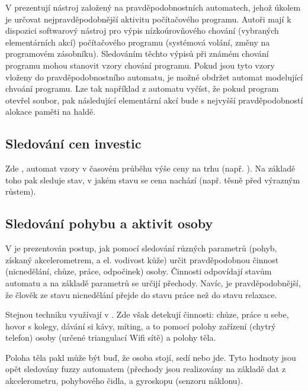\documentclass[a4paper,10pt]{article}
\begin{document}
V \cite{Maz+-ProTreAutAppBehMod} prezentují nástroj založený na pravděpodobnostních automatech, jehož úkolem je určovat nejpravděpodobnější aktivitu počítačového programu. Autoři mají k dispozici softwarový nástroj pro výpis nízkoúrovňového chování (vybraných elementárních akcí) počítačového programu (systémová volání, změny na programovém zásobníku). Sledováním těchto výpisů při známém chování programu mohou stanovit vzory chování programu. Pokud jsou tyto vzory vloženy do pravděpodobnostního automatu, je možné obdržet automat modelující chvoání programu. Lze tak například z automatu vyčíst, že pokud program otevřel soubor, pak následující elementární akcí bude s nejvyšší pravděpodobností alokace paměti na haldě.


\subsection{Sledování cen investic}
Zde \cite{ManPra-PriPatDetUsFiStMaFuzTra}, automat  vzory v časovém průběhu výše ceny na trhu (např. ). Na základě toho pak sleduje stav, v jakém stavu se cena nachází (např. těsně před výrazným růstem).

\subsection{Sledování pohybu a aktivit osoby}
V \cite{TriHei-LinSumHumActSkiConAcc} je prezentován postup, jak pomocí sledování různých parametrů (pohyb, získaný akcelerometrem, a el. vodivost kůže) určit pravděpodobnou činnost (nicnedělání, chůze, práce, odpočinek) osoby. Činnosti odpovídají stavům automatu a na základě parametrů se určijí přechody. Navíc, je pravděpodobnější, že člověk ze stavu nicnedělání přejde do stavu práce než do stavu relaxace.

Stejnou techniku využívají v \cite{Alv+-HumActRec+}. Zde však detekují činnosti: chůze, práce u sebe, hovor s kolegy, dávání si kávy, míting, a to pomocí polohy zařízení (chytrý telefon) osoby (určené triangulací Wifi sítě) a polohy těla.

Poloha těla pakl může být buď, že osoba stojí, sedí nebo jde. Tyto hodnoty jsou opět sledovány fuzzy automatem (přechody jsou realizovány na základě dat z akcelerometru, pohybového čidla, a gyroskopu (senzoru náklonu). 
\end{document}

